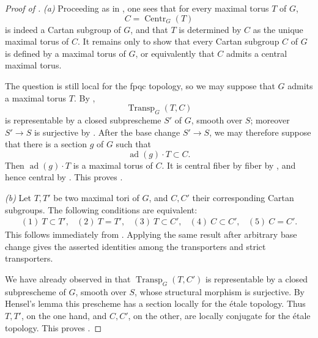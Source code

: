 \begin{proof}[Proof of ]
\emph{(a)} Proceeding as in , one sees that for every maximal
torus \(T\) of \(G\),
\[
  C=\operatorname{Centr}_G(T)
\]
is indeed a Cartan subgroup of \(G\), and that \(T\) is determined
by \(C\) as the unique maximal torus of \(C\). It remains only to
show that every Cartan subgroup \(C\) of \(G\) is defined by a
maximal torus of \(G\), or equivalently that \(C\) admits a central
maximal torus.

The question is still local for the fpqc topology, so we may suppose
that \(G\) admits a maximal torus \(T\). By ,
\[
  \operatorname{Transp}_G(T,C)
\]
is representable by a closed subprescheme \(S'\) of \(G\), smooth
over \(S\); moreover \(S'\to S\) is surjective by . After the
base change \(S'\to S\), we may therefore suppose that there is a
section \(g\) of \(G\) such that
\[
  \operatorname{ad}(g)\cdot T\subset C.
\]
Then \(\operatorname{ad}(g)\cdot T\) is a maximal torus of \(C\).
It is central fiber by fiber by , and hence central by
. This proves \textup{}.

\emph{(b)} Let \(T,T'\) be two maximal tori of \(G\), and \(C,C'\)
their corresponding Cartan subgroups. The following conditions are
equivalent:
\[
\begin{array}{ccccc}
(1)\ T\subset T',&
(2)\ T=T',&
(3)\ T\subset C',&
(4)\ C\subset C',&
(5)\ C=C'.
\end{array}
\]
This follows immediately from \textup{}. Applying the same result
after arbitrary base change gives the asserted identities among the
transporters and strict transporters.

We have already observed in \textup{} that
\(\operatorname{Transp}_G(T,C')\) is representable by a closed
subprescheme of \(G\), smooth over \(S\), whose structural morphism
is surjective. By Hensel's lemma this prescheme has a section locally
for the étale topology. Thus \(T,T'\), on the one hand, and \(C,C'\),
on the other, are locally conjugate for the étale topology. This
proves \textup{}.


\end{proof}
